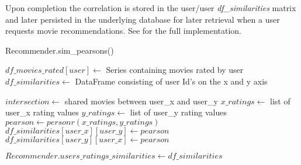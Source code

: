 	Upon completion the correlation is stored in the user/user \textit{df\_similarities} matrix and later persisted in the underlying database for later retrieval when a user requests movie recommendations. See \cite{Munk2017} for the full implementation.

	\begin{algorithm}[H]
		\caption{Recommender.sim\_pearsons()}
		\label{alg:simpearsons}
		\begin{algorithmic}
			\STATE $df\_movies\_rated[user] \leftarrow$ Series containing movies rated by user
			\STATE $df\_similarities \leftarrow$ DataFrame consisting of user Id's on the x and y axis
			
						\STATE $intersection \leftarrow$ shared movies between user\_x and user\_y
							\STATE $x\_ratings \leftarrow$ list of user\_x rating values
							\STATE $y\_ratings \leftarrow$ list of user\_y rating values
							\STATE $pearson \leftarrow personr(x\_ratings, y\_ratings)$
							\STATE $df\_similarities[user\_x][user\_y] \leftarrow pearson$
							\STATE $df\_similarities[user\_y][user\_x] \leftarrow pearson$
						\ENDIF
					\ENDIF
				\ENDFOR
			\ENDFOR
			
			\STATE $Recommender.users\_ratings\_similarities \leftarrow df\_similarities$
		\end{algorithmic}
	\end{algorithm}

